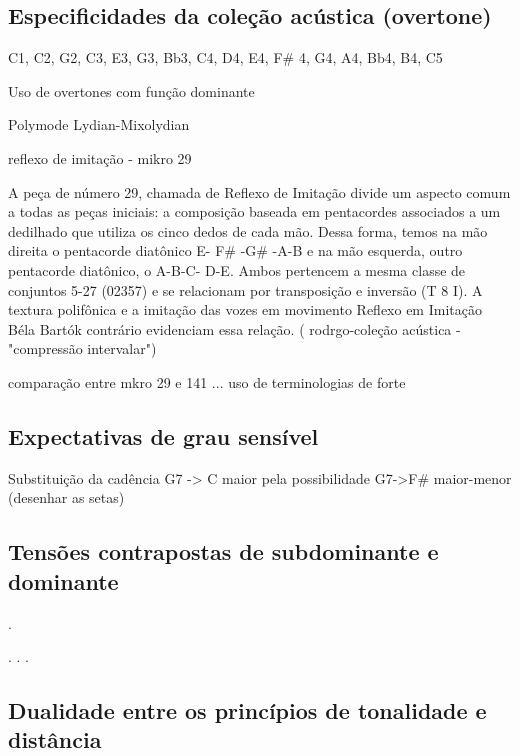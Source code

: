 \documentclass[
	12pt,				%
	openright,			%
	twoside,			%
	a4paper,			%
	english,			%
	french,				%
	spanish,			%
	brazil				%
	]{abntex2}
\begin{document}
\subsection{Especificidades da coleção acústica (overtone)}

C1, C2, G2, C3, E3, G3, Bb3, C4, D4, E4, F\# 4, G4, A4, Bb4, B4, C5

Uso de overtones com função dominante


Polymode  Lydian-Mixolydian
\cite{suchoff2004bartok}

reflexo de imitação - mikro 29

A peça de número 29, chamada de Reflexo de Imitação divide um aspecto
comum a todas as peças iniciais: a composição baseada em pentacordes associados a um
dedilhado que utiliza os cinco dedos de cada mão. Dessa forma, temos na mão direita o
pentacorde diatônico E- F\# -G\# -A-B e na mão esquerda, outro pentacorde diatônico, o A-B-C-
D-E. Ambos pertencem a mesma classe de conjuntos 5-27 (02357) e se relacionam por
transposição e inversão (T 8 I). A textura
polifônica
e a imitação das vozes em movimento
Reflexo
em Imitação
Béla Bartók
contrário evidenciam essa relação.
( rodrgo-coleção acústica - "compressão intervalar")


comparação entre mkro 29 e 141 ... uso de terminologias de forte
\cite[p. 126]{tymoczko2011geometry}














\subsection{Expectativas de grau sensível}

Substituição da cadência G7 -> C maior pela possibilidade G7->F\# maior-menor (desenhar as setas)

\subsection{Tensões contrapostas de subdominante e dominante}
.

.
.
.


\subsection{Dualidade entre os princípios de tonalidade e distância}
\end{document}
